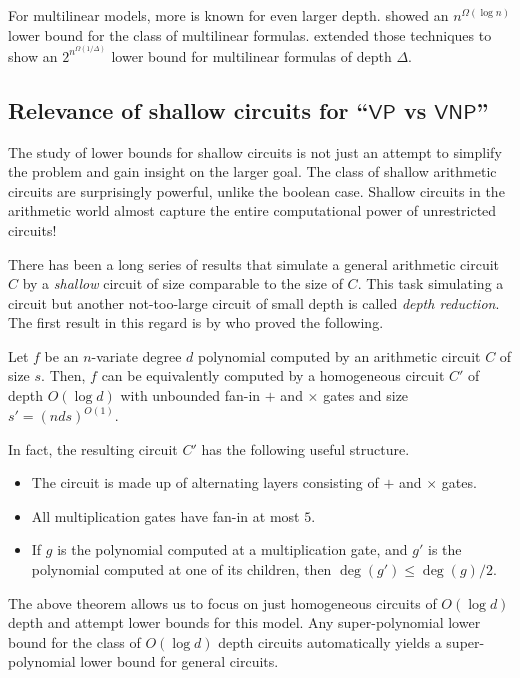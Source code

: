 \documentclass{beatcs}
\newcommand{\VP}{\mathsf{VP}}
\newcommand{\VNP}{\mathsf{VNP}}
\begin{document}
For multilinear models, more is known for even larger depth. \cite{raz2004} showed an $n^{\Omega(\log n)}$ lower bound for the class of multilinear formulas. \cite{raz-yehudayoff} extended those techniques to show an $2^{n^{\Omega(1/\Delta)}}$ lower bound for multilinear formulas of depth $\Delta$. 

\subsection{Relevance of shallow circuits for ``$\VP$ vs $\VNP$''}

The study of lower bounds for shallow circuits is not just an attempt to simplify the problem and gain insight on the larger goal. The class of shallow arithmetic circuits are surprisingly powerful, unlike the boolean case. Shallow circuits in the arithmetic world almost capture the entire computational power of unrestricted circuits! 

There has been a long series of results that simulate a general arithmetic circuit $C$ by a \emph{shallow} circuit of size comparable to the size of $C$. This task simulating a circuit but another not-too-large circuit of small depth is called \emph{depth reduction}. The first result in this regard is by \cite{vsbr83} who proved the following. 

\begin{theorem} \label{thm:vsbr}
Let $f$ be an $n$-variate degree $d$ polynomial computed by an arithmetic circuit $C$ of size $s$. Then, $f$ can be equivalently computed by a homogeneous circuit $C'$ of depth $O(\log d)$ with unbounded fan-in $+$ and $\times$ gates and size $s' = (nds)^{O(1)}$. 
\end{theorem}

In fact, the resulting circuit $C'$ has the following useful structure. 

\begin{itemize}
\item The circuit is made up of alternating layers consisting of $+$ and $\times$  gates. 
\item All multiplication gates have fan-in at most $5$.
\item If $g$ is the polynomial computed at a multiplication gate, and $g'$ is the polynomial computed at one of its children, then $\deg(g') \leq \deg(g)/2$. 
\end{itemize}

The above theorem allows us to focus on just homogeneous circuits of $O(\log d)$ depth and attempt lower bounds for this model. Any super-polynomial lower bound for the class of $O(\log d)$ depth circuits automatically yields a super-polynomial lower bound for general circuits. \\
\end{document}

